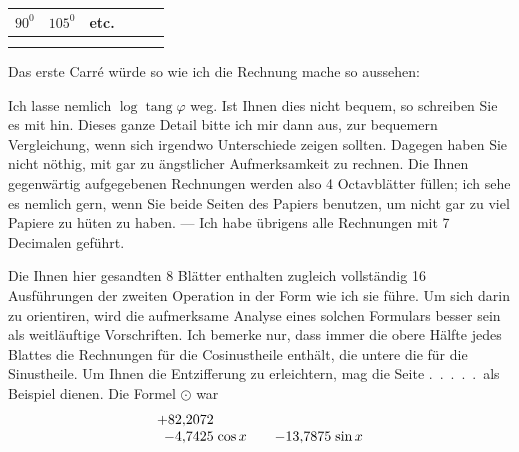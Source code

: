 \begin{landscape}
\begin{center}
\begin{tabular}{|c|c|c|c|c|c|}
\(90^0\)&\(105^0\)&etc.&&&\\\hline
\rule{0pt}{1.8em}&&&&&\\\hline
\rule{0pt}{1.8em}&&&&&\\\hline
\end{tabular}
\end{center}\endgroup
{}
\par\noindent Das erste Carré würde so wie ich die Rechnung mache so aussehen:
\begin{center}
\end{center}
\par\noindent Ich lasse nemlich \(\log\operatorname{tang}\varphi\) weg. Ist Ihnen dies
nicht bequem, so schreiben Sie es mit hin.
Dieses ganze Detail bitte ich mir dann aus, zur
bequemern Vergleichung, wenn sich irgendwo
Unterschiede zeigen sollten. Dagegen haben Sie
nicht nöthig, mit gar zu ängstlicher Aufmerksamkeit zu rechnen. Die Ihnen gegenwärtig aufgegebenen Rechnungen werden also 4 Octavblätter füllen; ich sehe es nemlich gern, wenn Sie beide Seiten des Papiers benutzen, um nicht gar zu viel
Papiere zu hüten zu haben. — Ich habe übrigens alle Rechnungen mit 7 Decimalen geführt.
\par\noindent\hspace*{\parindent}Die Ihnen hier gesandten 8 Blätter enthalten zugleich vollständig 16 Ausführungen der zweiten Operation in der Form wie ich sie führe. Um sich
darin zu orientiren, wird die aufmerksame Analyse eines solchen Formulars
besser sein als weitläuftige Vorschriften. Ich bemerke nur, dass immer die
obere Hälfte jedes Blattes die Rechnungen für die Cosinustheile enthält, die
untere die für die Sinustheile. Um Ihnen die Entzifferung zu erleichtern,
mag die Seite .\ .\ .\ .\ .\ als Beispiel dienen. Die Formel \(\odot\) war
\[
\begin{array}{r@{\;}l@{\qquad}r@{\;}l}
+82{,}2072&&&\\
-4{,}7425&\cos x&-13{,}7875&\sin x\\

\end{array}\]
\end{landscape}
